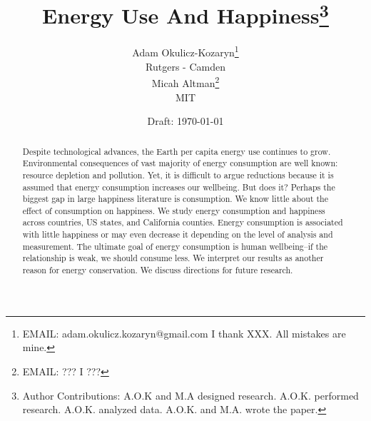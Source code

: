 \documentclass[10pt, letterpaper]{article}
\date{Draft: {}\today}
\title{
Energy Use And Happiness\footnote{Author Contributions: A.O.K and M.A designed
  research. A.O.K. performed research. A.O.K. analyzed data. A.O.K. and
  M.A. wrote the paper.  %
}
}
\author{
Adam Okulicz-Kozaryn\thanks{EMAIL: adam.okulicz.kozaryn@gmail.com
  \hfill I thank XXX.  All mistakes are mine.} \\
{\small Rutgers - Camden}\\
Micah Altman\thanks{EMAIL: ???
  \hfill I ???} \\
{\small MIT}
}
\begin{document}


\maketitle
\vspace{-.4in}
\begin{center}

\end{center}

\begin{abstract}
\noindent Despite technological advances, the Earth per capita energy use
continues to grow. %
Environmental consequences of vast majority of energy consumption are well known:
resource depletion and pollution. Yet, it is difficult to argue reductions
because it is assumed that energy consumption increases our wellbeing. But does
it?  Perhaps the biggest gap in large happiness literature is
consumption. We know little about the effect of consumption on happiness. %
We study energy consumption and happiness
across countries, US states, and California counties. Energy consumption
 is associated with  little happiness or may even decrease it depending on the level
of analysis and  measurement. %
 The ultimate goal of energy consumption is human wellbeing--if the 
 relationship is weak,  we should consume less.  We interpret our results as another reason for energy conservation. We discuss directions for future research.
\end{abstract}
\end{document}

